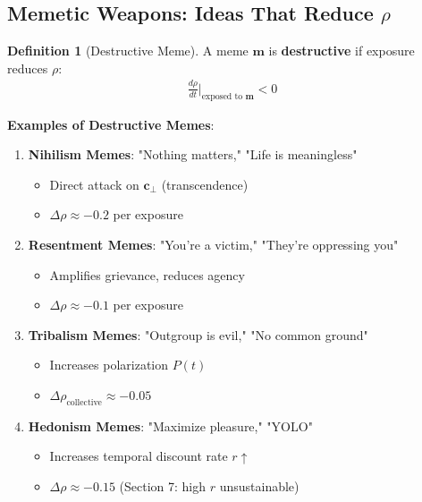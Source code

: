 \documentclass[11pt,a4paper]{article}
\theoremstyle{definition}
\newtheorem{definition}{Definition}[section]
\theoremstyle{remark}
\newcommand{\cc}{\mathbf{c}}
\begin{document}
\begin{small}
\begin{enumerate}
\subsection{Memetic Weapons: Ideas That Reduce \(\rho\)}

\begin{definition}[Destructive Meme]
A meme \(\mathbf{m}\) is \textbf{destructive} if exposure reduces \(\rho\):
\begin{align}
\frac{d\rho}{dt}\bigg|_{\text{exposed to } \mathbf{m}} < 0
\end{align}

\textbf{Examples of Destructive Memes}:
\begin{enumerate}
    \item \textbf{Nihilism Memes}: "Nothing matters," "Life is meaningless"
        \begin{itemize}
            \item Direct attack on \(\cc_\perp\) (transcendence)
            \item \(\Delta\rho \approx -0.2\) per exposure
        \end{itemize}
    
    \item \textbf{Resentment Memes}: "You're a victim," "They're oppressing you"
        \begin{itemize}
            \item Amplifies grievance, reduces agency
            \item \(\Delta\rho \approx -0.1\) per exposure
        \end{itemize}
    
    \item \textbf{Tribalism Memes}: "Outgroup is evil," "No common ground"
        \begin{itemize}
            \item Increases polarization \(P(t)\)
            \item \(\Delta\rho_{\text{collective}} \approx -0.05\)
        \end{itemize}
    
    \item \textbf{Hedonism Memes}: "Maximize pleasure," "YOLO"
        \begin{itemize}
            \item Increases temporal discount rate \(r \uparrow\)
            \item \(\Delta\rho \approx -0.15\) (Section 7: high \(r\) unsustainable)
        \end{itemize}
    

\end{enumerate}
\end{definition}
\end{enumerate}
\end{small}
\end{document}
